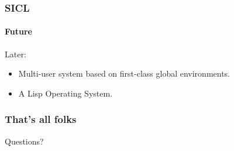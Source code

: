 \documentclass[12pt]{beamer}
\def\inputfig#1{}
\begin{document}
\begin{frame}
  \frametitle{SICL}
  \framesubtitle{Future}
Later:
\begin{itemize}
\item Multi-user system based on first-class global environments. 
\item A Lisp Operating System.
\end{itemize}
\end{frame}
\begin{frame}
  \frametitle{That's all folks}
  
Questions?

  \begin{center}
\inputfig{lizard.pdf_t}
  \end{center}

\end{frame}
\end{document}
